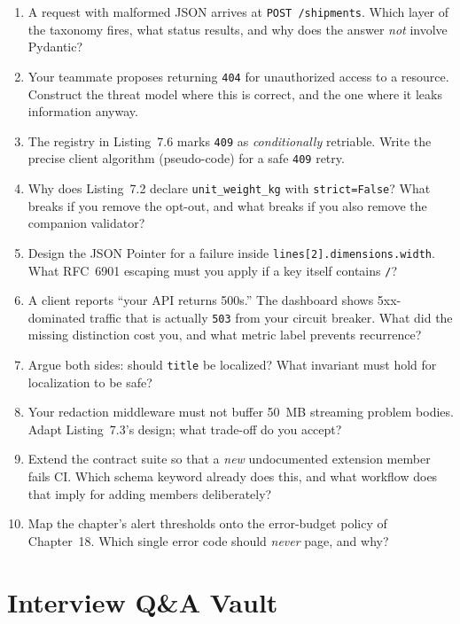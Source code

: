 \begin{enumerate}
  \item A request with malformed JSON arrives at \texttt{POST /shipments}.
        Which layer of the taxonomy fires, what status results, and why does
        the answer \emph{not} involve Pydantic?
  \item Your teammate proposes returning \texttt{404} for unauthorized
        access to a resource. Construct the threat model where this is
        correct, and the one where it leaks information anyway.
  \item The registry in Listing~7.6 marks \texttt{409} as
        \emph{conditionally} retriable. Write the precise client algorithm
        (pseudo-code) for a safe \texttt{409} retry.
  \item Why does Listing~7.2 declare \texttt{unit\_weight\_kg} with
        \texttt{strict=False}? What breaks if you remove the opt-out, and
        what breaks if you also remove the companion validator?
  \item Design the JSON Pointer for a failure inside
        \texttt{lines[2].dimensions.width}. What RFC~6901 escaping must you
        apply if a key itself contains \texttt{/}?
  \item A client reports ``your API returns 500s.'' The dashboard shows
        5xx-dominated traffic that is actually \texttt{503} from your
        circuit breaker. What did the missing distinction cost you, and what
        metric label prevents recurrence?
  \item Argue both sides: should \texttt{title} be localized? What invariant
        must hold for localization to be safe?
  \item Your redaction middleware must not buffer 50~MB streaming problem
        bodies. Adapt Listing~7.3's design; what trade-off do you accept?
  \item Extend the contract suite so that a \emph{new} undocumented
        extension member fails CI. Which schema keyword already does this,
        and what workflow does that imply for adding members deliberately?
  \item Map the chapter's alert thresholds onto the error-budget policy of
        Chapter~18. Which single error code should \emph{never} page, and
        why?
\end{enumerate}

\section{Interview Q\&A Vault}

